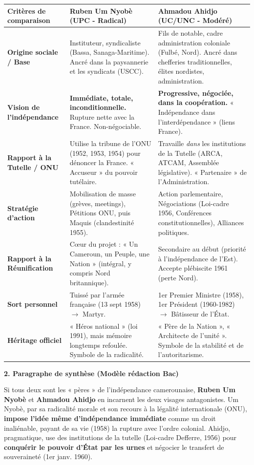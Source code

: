\documentclass[11pt]{article}
\newcommand{\cle}[1]{{\popxbold\color{popdark}#1}}
\begin{document}
\begin{exoresolu}
\begin{center}
\begin{tabularx}{\linewidth}{|l|X|X|}\hline
\textbf{Critères de comparaison} & \textbf{Ruben Um Nyobè (UPC - Radical)} & \textbf{Ahmadou Ahidjo (UC/UNC - Modéré)} \\ \hline
\textbf{Origine sociale / Base} & Instituteur, syndicaliste (Bassa, Sanaga-Maritime). Ancré dans la paysannerie et les syndicats (USCC). & Fils de notable, cadre administration coloniale (Fulbé, Nord). Ancré dans chefferies traditionnelles, élites nordistes, administration. \\ \hline
\textbf{Vision de l'indépendance} & \textbf{Immédiate, totale, inconditionnelle.} Rupture nette avec la France. Non-négociable. & \textbf{Progressive, négociée, dans la coopération.} « Indépendance dans l'interdépendance » (liens France). \\ \hline
\textbf{Rapport à la Tutelle / ONU} & Utilise la tribune de l'ONU (1952, 1953, 1954) pour dénoncer la France. « Accuseur » du pouvoir tutélaire. & Travaille \emph{dans} les institutions de la Tutelle (ARCA, ATCAM, Assemblée législative). « Partenaire » de l'Administration. \\ \hline
\textbf{Stratégie d'action} & Mobilisation de masse (grèves, meetings), Pétitions ONU, puis Maquis (clandestinité 1955). & Action parlementaire, Négociations (Loi-cadre 1956, Conférences constitutionnelles), Alliances politiques. \\ \hline
\textbf{Rapport à la Réunification} & Cœur du projet : « Un Cameroun, un Peuple, une Nation » (intégral, y compris Nord britannique). & Secondaire au début (priorité à l'indépendance de l'Est). Accepte plébiscite 1961 (perte Nord). \\ \hline
\textbf{Sort personnel} & Tuissé par l'armée française (13 sept 1958) $\rightarrow$ \cle{Martyr}. & 1er Premier Ministre (1958), 1er Président (1960-1982) $\rightarrow$ \cle{Bâtisseur de l'État}. \\ \hline
\textbf{Héritage officiel} & « Héros national » (loi 1991), mais mémoire longtemps refoulée. Symbole de la \cle{radicalité}. & « Père de la Nation », « Architecte de l'unité ». Symbole de la \cle{stabilité} et de l'autoritarisme. \\ \hline
\end{tabularx}
\end{center}

\textbf{2. Paragraphe de synthèse (Modèle rédaction Bac)}

Si tous deux sont les « pères » de l'indépendance camerounaise, \textbf{Ruben Um Nyobè} et \textbf{Ahmadou Ahidjo} en incarnent les deux visages antagonistes. Um Nyobè, par sa radicalité morale et son recours à la légalité internationale (ONU), \textbf{impose l'idée même d'indépendance immédiate} comme un droit inaliénable, payant de sa vie (1958) la rupture avec l'ordre colonial. Ahidjo, pragmatique, use des institutions de la tutelle (Loi-cadre Defferre, 1956) pour \textbf{conquérir le pouvoir d'État par les urnes} et négocier le transfert de souveraineté (1er janv. 1960). 


\end{exoresolu}
\end{document}
